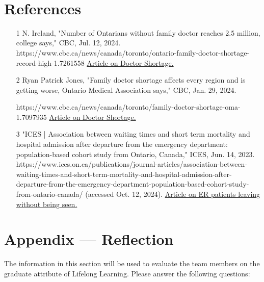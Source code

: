 \documentclass[12pt]{article}
\begin{document}
~\newpage

\section{References}
\begin{itemize}
  \item
  [1]N. Ireland, "Number of Ontarians without family doctor reaches 2.5 million, college says," CBC, Jul. 12, 2024. https://www.cbc.ca/news/canada/toronto/ontario-family-doctor-shortage-record-high-1.7261558
  \href{https://www.cbc.ca/news/canada/toronto/ontario-family-doctor-shortage-record-high-1.7261558}{Article on Doctor Shortage.}
  \item 
  [2]Ryan Patrick Jones, "Family doctor shortage affects every region and is getting worse, Ontario Medical Association says," CBC, Jan. 29, 2024.
  
  https://www.cbc.ca/news/canada/toronto/family-doctor-shortage-oma-1.7097935
  \href{https://www.cbc.ca/news/canada/toronto/family-doctor-shortage-oma-1.7097935}{Article on Doctor Shortage.}
  \item
  [3]"ICES | Association between waiting times and short term mortality and hospital admission after departure from the emergency department: population-based cohort study from Ontario, Canada," ICES, Jun. 14, 2023. https://www.ices.on.ca/publications/journal-articles/association-between-waiting-times-and-short-term-mortality-and-hospital-admission-after-departure-from-the-emergency-department-population-based-cohort-study-from-ontario-canada/ (accessed Oct. 12, 2024).
  \href{https://www.ices.on.ca/publications/journal-articles/association-between-waiting-times-and-short-term-mortality-and-hospital-admission-after-departure-from-the-emergency-department-population-based-cohort-study-from-ontario-canada/}{Article on ER patients leaving without being seen.}
\end{itemize}

\newpage{}
\section*{Appendix --- Reflection}

The information in this section will be used to evaluate the team members on the
graduate attribute of Lifelong Learning.  Please answer the following questions:
\end{document}
